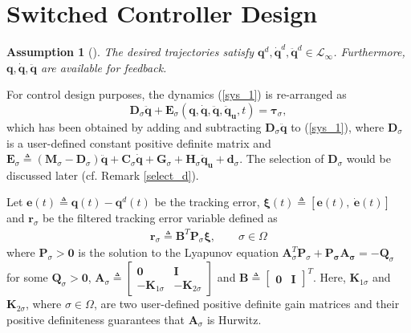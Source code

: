 \documentclass[AMA,STIX1COL,sort, compress]{WileyNJD-v2}
\newtheorem{assum}{\textbf{Assumption}}
\begin{document}
\section{Switched Controller Design}
\begin{assum}[\cite{roy2017adaptive, spong1990adaptive}]\label{assm2}
	The desired trajectories satisfy $\mathbf{q}^d,\dot{\mathbf q}^d, \ddot{\mathbf q}^d \in \mathcal{L}_{\infty}$. Furthermore, $\mathbf{q}, \dot{\mathbf{q}},\ddot{\mathbf q}$ are available for feedback.
\end{assum}
For control design purposes, the dynamics (\ref{sys_1}) is re-arranged as
\begin{equation}\label{sys_2}
\mathbf D_\sigma \ddot{ \mathbf q}+\mathbf E_{\sigma}(\mathbf q,\dot{\mathbf q}, \ddot{\mathbf q},\ddot{\mathbf q}_{\mathbf u},t)=\boldsymbol \tau_{\sigma},
\end{equation} 
which has been obtained by adding and subtracting $\mathbf{D}_\sigma \ddot{\mathbf q}$ to (\ref{sys_1}), where $\mathbf D_\sigma$ is a user-defined constant positive definite matrix and $\mathbf E_{\sigma} \triangleq (\mathbf M_{\sigma}-\mathbf D_\sigma)\ddot{ \mathbf q}+\mathbf C_{\sigma}\dot{\mathbf q}+\mathbf G_{\sigma}+ \mathbf{H}_\sigma\ddot{ \mathbf{q}}_{\mathbf u}+\mathbf{ d}_{\sigma}$. The selection of $\mathbf D_\sigma$ would be discussed later (cf. Remark \ref{select_d}). %


Let $\mathbf {e}(t) \triangleq \mathbf q(t)-\mathbf {q}^d(t)$ be the tracking error, $\boldsymbol \xi (t) \triangleq [\mathbf e(t),~\dot{\mathbf {e}}(t)]$ and $\mathbf r_{\sigma}$ be the filtered tracking error variable defined as
\begin{align}
\mathbf{r}_{\sigma} \triangleq \mathbf{B}^T \mathbf{P}_{\sigma} \boldsymbol \xi, \qquad \sigma \in \Omega \label{r}
\end{align}
where $\mathbf{P}_{\sigma}  >\mathbf 0$ is the solution to the Lyapunov equation $\mathbf{A}_{\sigma}^T \mathbf P_{\sigma} + \mathbf {P_{\sigma} A_{\sigma}}= -\mathbf Q_{\sigma}$ for some $\mathbf{Q}_{\sigma} >\mathbf 0$, $\mathbf A_{\sigma} \triangleq \begin{bmatrix}
\mathbf 0 & \mathbf I\\ 
- \mathbf K_{1\sigma}&  - \mathbf K_{2\sigma}
\end{bmatrix}$ and $\mathbf B \triangleq \begin{bmatrix}
\mathbf 0 &
\mathbf I
\end{bmatrix}^T$. Here, $\mathbf K_{1\sigma}$ and $\mathbf K_{2\sigma}$, {\color{black}where $\sigma \in \Omega$}, are two user-defined positive definite gain matrices and their positive definiteness guarantees that $\mathbf{A}_{\sigma}$ is Hurwitz.
\end{document}
